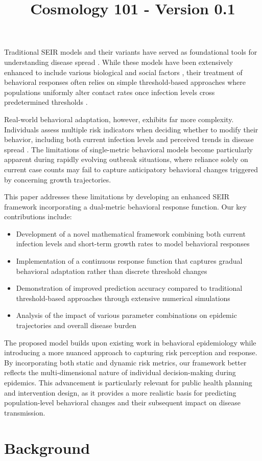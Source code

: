 \documentclass{article}\usepackage{graphicx} \usepackage{amsmath} \usepackage{colortbl}\title{Cosmology 101 - Version 0.1}
\begin{document}
Traditional SEIR models and their variants have served as foundational tools for understanding disease spread \cite{anderson1992infectious}. While these models have been extensively enhanced to include various biological and social factors \cite{hethcote2000mathematics}, their treatment of behavioral responses often relies on simple threshold-based approaches where populations uniformly alter contact rates once infection levels cross predetermined thresholds \cite{funk2010modelling}.

Real-world behavioral adaptation, however, exhibits far more complexity. Individuals assess multiple risk indicators when deciding whether to modify their behavior, including both current infection levels and perceived trends in disease spread \cite{wang2020impact}. The limitations of single-metric behavioral models become particularly apparent during rapidly evolving outbreak situations, where reliance solely on current case counts may fail to capture anticipatory behavioral changes triggered by concerning growth trajectories.

This paper addresses these limitations by developing an enhanced SEIR framework incorporating a dual-metric behavioral response function. Our key contributions include:

\begin{itemize}
\item Development of a novel mathematical framework combining both current infection levels and short-term growth rates to model behavioral responses
\item Implementation of a continuous response function that captures gradual behavioral adaptation rather than discrete threshold changes
\item Demonstration of improved prediction accuracy compared to traditional threshold-based approaches through extensive numerical simulations
\item Analysis of the impact of various parameter combinations on epidemic trajectories and overall disease burden
\end{itemize}

The proposed model builds upon existing work in behavioral epidemiology \cite{verelst2016behavioural} while introducing a more nuanced approach to capturing risk perception and response. By incorporating both static and dynamic risk metrics, our framework better reflects the multi-dimensional nature of individual decision-making during epidemics. This advancement is particularly relevant for public health planning and intervention design, as it provides a more realistic basis for predicting population-level behavioral changes and their subsequent impact on disease transmission.\section{Background}
\end{document}
